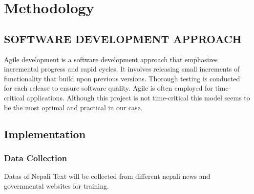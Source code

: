     \chapter{Methodology}
       \section{SOFTWARE DEVELOPMENT APPROACH}
       Agile development is a software development approach that emphasizes incremental progress and rapid cycles. It involves releasing small increments of functionality that build upon previous versions. Thorough testing is conducted for each release to ensure software quality. Agile is often employed for time-critical applications. Although this project is not time-critical this model seems to be the most optimal and practical in our case.
       \begin{figure}[hbt!]
       \end{figure}
       
       \section{Implementation}

       \subsection{Data Collection}
       Datas of Nepali Text will be collected from different nepali news and governmental websites for training.
       

